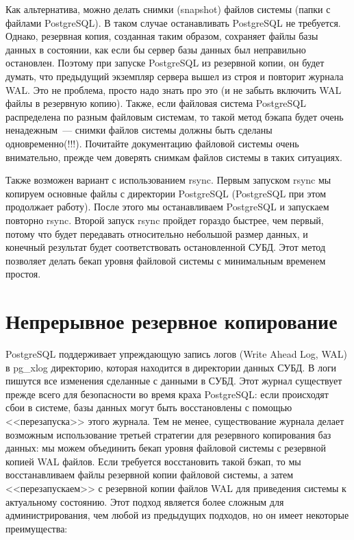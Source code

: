 Как альтернатива, можно делать снимки (snapshot) файлов системы (папки с файлами PostgreSQL). В таком случае останавливать PostgreSQL не требуется. Однако, резервная копия, созданная таким образом, сохраняет файлы базы данных в состоянии, как если бы сервер базы данных был неправильно остановлен. Поэтому при запуске PostgreSQL из резервной копии, он будет думать, что предыдущий экземпляр сервера вышел из строя и повторит журнала WAL. Это не проблема, просто надо знать про это (и не забыть включить WAL файлы в резервную копию). Также, если файловая система PostgreSQL распределена по разным файловым системам, то такой метод бэкапа будет очень ненадежным~--- снимки файлов системы должны быть сделаны одновременно(!!!). Почитайте документацию файловой системы очень внимательно, прежде чем доверять снимкам файлов системы в таких ситуациях.

Также возможен вариант с использованием rsync. Первым запуском rsync мы копируем основные файлы с директории PostgreSQL (PostgreSQL при этом продолжает работу). После этого мы останавливаем PostgreSQL и запускаем повторно rsync. Второй запуск rsync пройдет гораздо быстрее, чем первый, потому что будет передавать относительно небольшой размер данных, и конечный результат будет соответствовать остановленной СУБД. Этот метод позволяет делать бекап уровня файловой системы с минимальным временем простоя.


\section{Непрерывное резервное копирование}

PostgreSQL поддерживает упреждающую запись логов (Write Ahead Log, WAL) в pg\_xlog директорию, которая находится в директории данных СУБД. В логи пишутся все изменения сделанные с данными в СУБД. Этот журнал существует прежде всего для безопасности во время краха PostgreSQL: если происходят сбои в системе, базы данных могут быть восстановлены с помощью <<перезапуска>> этого журнала. Тем не менее, существование журнала делает возможным использование третьей стратегии для резервного копирования баз данных: мы можем объединить бекап уровня файловой системы с резервной копией WAL файлов. Если требуется восстановить такой бэкап, то мы восстанавливаем файлы резервной копии файловой системы, а затем <<перезапускаем>> с резервной копии файлов WAL для приведения системы к актуальному состоянию. Этот подход является более сложным для администрирования, чем любой из предыдущих подходов, но он имеет некоторые преимущества:

